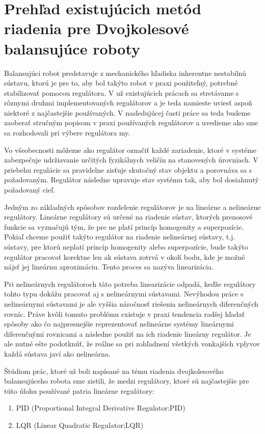 \chapter{Prehľad existujúcich	metód riadenia pre	Dvojkolesové balansujúce roboty}

Balansujúci robot predstavuje z mechanického hľadiska inherentne nestabilnú sústavu, ktorú je pre to, aby bol takýto robot v praxi použiteľný, potrebné stabilizovať pomocou regulátora. V už existujúcich prácach sa stretávame s rôznymi druhmi implementovaných regulátorov a je teda namieste uviesť aspoň niektoré z najčastejšie používaných. V nasledujúcej časti práce sa teda budeme zaoberať  stručným popisom v praxi používaných regulátorov a uvedieme ako sme sa rozhodovali pri výbere regulátora my.

Vo všeobecnosti môžeme ako regulátor označiť každé zariadenie, ktoré v systéme zabezpečuje udržiavanie určitých fyzikálnych veličín na stanovených úrovniach. V priebehu regulácie sa pravidelne zisťuje skutočný stav objektu a porovnáva sa s požadovaným.  Regulátor následne upravuje stav systému tak, aby bol dosiahnutý požadovaný cieľ.

Jedným zo základných spôsobov rozdelenie regulátorov je na lineárne a nelineárne regulátory. Lineárne regulátory sú určené na riadenie sústav, ktorých prenosové funkcie sa vyznačujú tým, že pre ne platí princíp homogenity a superpozície. Pokiaľ chceme použiť takýto regulátor na riadenie nelineárnej sústavy, t.j. sústavy, pre ktorú neplatí princíp homogenity alebo superpozície, bude takýto regulátor pracovať korektne len ak sústava zotrvá v okolí bodu, kde je možné nájsť jej lineárnu aproximáciu. Tento proces sa nazýva linearizácia. 

Pri nelineárnych regulátoroch táto potreba linearizácie odpadá, keďže regulátory tohto typu dokážu pracovať aj s nelineárnymi sústavami. Nevýhodou práce s nelineárnymi sústavami je ale vyššia náročnosť riešenia nelineárnych diferenčných rovníc. Práve kvôli  tomuto problému existuje v praxi tendencia radšej hľadať spôsoby ako čo najpresnejšie reprezentovať nelineárne systémy lineárnymi diferenčnými rovnicami a následne použiť na ich riadenie lineárny regulátor. Je ale nutné ešte podotknúť, že reálne sa pri zohľadnení všetkých vonkajších vplyvov každá sústava javí ako nelineárna. 

Štúdiom prác, ktoré už boli napísané na tému riadenia dvojkolesového balansujúceho robota sme zistili, že medzi regulátory, ktoré sú najčastejšie pre túto úlohu používané patria lineárne regulátory:
\begin{enumerate}
\item \ac{PID} (Proportional Integral Derivative Regulator:PID)
\item \ac{LQR}  (Linear Quadratic Regulator;LQR)
\end{enumerate}

